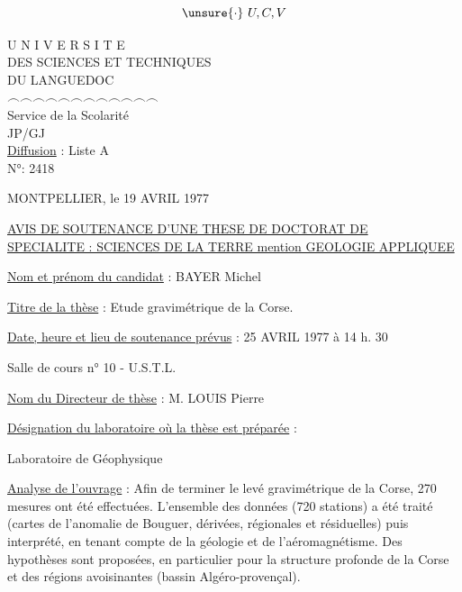 \[
\unsure{\cdot}\ U,C,V
\]


\begingroup\ttfamily

\noindent
\begin{minipage}[t]{.48\linewidth}\centering
U N I V E R S I T E\\
DES SCIENCES ET TECHNIQUES\\
DU LANGUEDOC\\
{\footnotesize $\frown\frown\frown\frown\frown\frown\frown\frown\frown\frown\frown\frown$}\\[.6em]
Service de la Scolarité\\
JP/GJ\\[.5em]
\uline{Diffusion} : Liste A\\
N°: 2418
\end{minipage}\hfill
\begin{minipage}[t]{.49\linewidth}\raggedleft
MONTPELLIER, le 19 AVRIL 1977\\
\end{minipage}

\begin{center}
\uline{AVIS DE SOUTENANCE D'UNE THESE DE DOCTORAT DE}\\[.5em]
\uline{SPECIALITE : SCIENCES DE LA TERRE mention GEOLOGIE APPLIQUEE}
\end{center}

\uline{Nom et prénom du candidat} : BAYER Michel

\uline{Titre de la thèse} : Etude gravimétrique de la Corse.

\uline{Date, heure et lieu de soutenance prévus} : 25 AVRIL 1977 à 14 h. 30

\hspace*{3em}Salle de cours n° 10 - U.S.T.L.

\uline{Nom du Directeur de thèse} : M. LOUIS Pierre

\uline{Désignation du laboratoire où la thèse est préparée} :

\hspace*{3em}Laboratoire de Géophysique

\uline{Analyse de l'ouvrage} : Afin de terminer le levé gravimétrique de la Corse, 270 mesures ont été effectuées. L'ensemble des données (720 stations) a été traité (cartes de l'anomalie de Bouguer, dérivées, régionales et résiduelles) puis interprété, en tenant compte de la géologie et de l'aéromagnétisme. Des hypothèses sont proposées, en particulier pour la structure profonde de la Corse et des régions avoisinantes (bassin Algéro-provençal).

